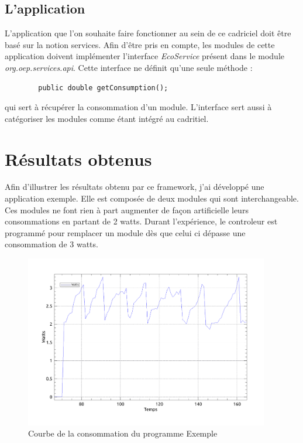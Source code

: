 \documentclass[a4paper, 11pt]{report}
\begin{document}
		\subsection{L'application}
L'application que l'on souhaite faire fonctionner au sein de ce cadriciel doit être basé sur la notion services. Afin d'être pris en compte, les modules de cette application doivent implémenter l'interface \textit{EcoService} présent dans le module \textit{org.oep.services.api}. Cette interface ne définit qu'une seule méthode :
\begin{verbatim}
        public double getConsumption();
\end{verbatim}
 qui sert à récupérer la consommation d'un module. L'interface sert aussi à catégoriser les modules comme étant intégré au cadritiel.
 
	\section{Résultats obtenus}
Afin d'illustrer les résultats obtenu par ce framework, j'ai développé une application exemple. Elle est composée de deux modules qui sont interchangeable. Ces modules ne font rien à part augmenter de façon artificielle leurs consommations en partant de 2 watts. Durant l'expérience, le controleur est programmé pour remplacer un module dès que celui ci dépasse une consommation de 3 watts. 

\begin{figure}
	\centering
	\includegraphics[width=0.95\textwidth]{figures/EcoPattern_Courbe_Exemple.pdf}
	\caption{Courbe de la consommation du programme Exemple}
	\label{CourbeExp}
\end{figure}
\end{document}

